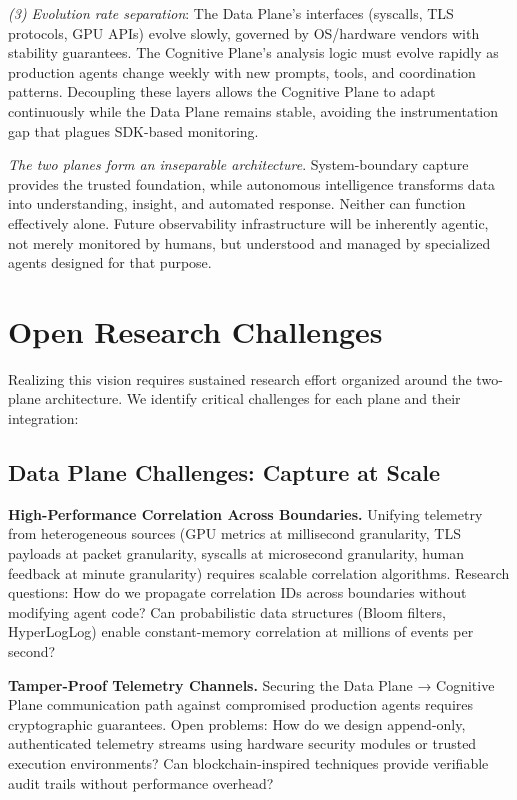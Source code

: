 \documentclass[sigplan,screen,9pt]{acmart}
\begin{document}
\emph{(3) Evolution rate separation}: The Data Plane's interfaces (syscalls, TLS protocols, GPU APIs) evolve slowly, governed by OS/hardware vendors with stability guarantees. The Cognitive Plane's analysis logic must evolve rapidly as production agents change weekly with new prompts, tools, and coordination patterns. Decoupling these layers allows the Cognitive Plane to adapt continuously while the Data Plane remains stable, avoiding the instrumentation gap that plagues SDK-based monitoring.

\emph{The two planes form an inseparable architecture}. System-boundary capture provides the trusted foundation, while autonomous intelligence transforms data into understanding, insight, and automated response. Neither can function effectively alone. Future observability infrastructure will be inherently agentic, not merely monitored by humans, but understood and managed by specialized agents designed for that purpose.

\section{Open Research Challenges}

Realizing this vision requires sustained research effort organized around the two-plane architecture. We identify critical challenges for each plane and their integration:

\subsection{Data Plane Challenges: Capture at Scale}

\textbf{High-Performance Correlation Across Boundaries.} Unifying telemetry from heterogeneous sources (GPU metrics at millisecond granularity, TLS payloads at packet granularity, syscalls at microsecond granularity, human feedback at minute granularity) requires scalable correlation algorithms. Research questions: How do we propagate correlation IDs across boundaries without modifying agent code? Can probabilistic data structures (Bloom filters, HyperLogLog) enable constant-memory correlation at millions of events per second?

\textbf{Tamper-Proof Telemetry Channels.} Securing the Data Plane → Cognitive Plane communication path against compromised production agents requires cryptographic guarantees. Open problems: How do we design append-only, authenticated telemetry streams using hardware security modules or trusted execution environments? Can blockchain-inspired techniques provide verifiable audit trails without performance overhead?
\end{document}
